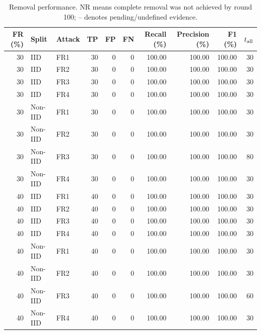 \begin{table}[t]
\centering\footnotesize\setlength{\tabcolsep}{4pt}
\caption{Removal performance. NR means complete removal was not achieved by round 100; -- denotes pending/undefined evidence.}\label{tab:detection}
\begin{tabular}{rllrrrrrrr}
\toprule
FR (\%) & Split & Attack & TP & FP & FN & Recall (\%) & Precision (\%) & F1 (\%) & $t_{\rm all}$ \\
\midrule
30 & IID & FR1 & 30 & 0 & 0 & 100.00 & 100.00 & 100.00 & 30 \\
30 & IID & FR2 & 30 & 0 & 0 & 100.00 & 100.00 & 100.00 & 30 \\
30 & IID & FR3 & 30 & 0 & 0 & 100.00 & 100.00 & 100.00 & 30 \\
30 & IID & FR4 & 30 & 0 & 0 & 100.00 & 100.00 & 100.00 & 30 \\
30 & Non-IID & FR1 & 30 & 0 & 0 & 100.00 & 100.00 & 100.00 & 30 \\
30 & Non-IID & FR2 & 30 & 0 & 0 & 100.00 & 100.00 & 100.00 & 30 \\
30 & Non-IID & FR3 & 30 & 0 & 0 & 100.00 & 100.00 & 100.00 & 80 \\
30 & Non-IID & FR4 & 30 & 0 & 0 & 100.00 & 100.00 & 100.00 & 30 \\
40 & IID & FR1 & 40 & 0 & 0 & 100.00 & 100.00 & 100.00 & 30 \\
40 & IID & FR2 & 40 & 0 & 0 & 100.00 & 100.00 & 100.00 & 30 \\
40 & IID & FR3 & 40 & 0 & 0 & 100.00 & 100.00 & 100.00 & 30 \\
40 & IID & FR4 & 40 & 0 & 0 & 100.00 & 100.00 & 100.00 & 30 \\
40 & Non-IID & FR1 & 40 & 0 & 0 & 100.00 & 100.00 & 100.00 & 30 \\
40 & Non-IID & FR2 & 40 & 0 & 0 & 100.00 & 100.00 & 100.00 & 30 \\
40 & Non-IID & FR3 & 40 & 0 & 0 & 100.00 & 100.00 & 100.00 & 60 \\
40 & Non-IID & FR4 & 40 & 0 & 0 & 100.00 & 100.00 & 100.00 & 30 \\
\bottomrule
\end{tabular}
\end{table}

